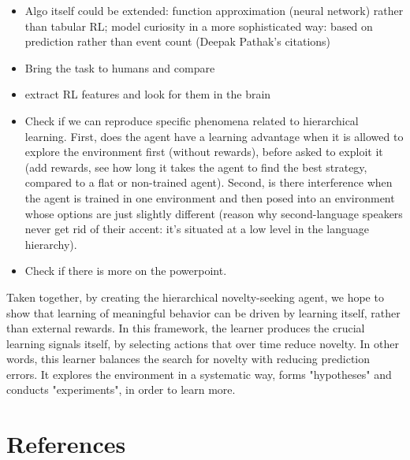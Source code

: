 \documentclass{article}
\begin{document}
\begin{itemize}
	\item Algo itself could be extended: function approximation (neural network) rather than tabular RL; model curiosity in a more sophisticated way: based on prediction rather than event count (Deepak Pathak's citations)
	\item Bring the task to humans and compare
	\item extract RL features and look for them in the brain
	\item Check if we can reproduce specific phenomena related to hierarchical learning. First, does the agent have a learning advantage when it is allowed to explore the environment first (without rewards), before asked to exploit it (add rewards, see how long it takes the agent to find the best strategy, compared to a flat or non-trained agent). Second, is there interference when the agent is trained in one environment and then posed into an environment whose options are just slightly different (reason why second-language speakers never get rid of their accent: it's situated at a low level in the language hierarchy).
	\item Check if there is more on the powerpoint.
\end{itemize}

Taken together, by creating the hierarchical novelty-seeking agent, we hope to show that learning of meaningful behavior can be driven by learning itself, rather than external rewards. In this framework, the learner produces the crucial learning signals itself, by selecting actions that over time reduce novelty. In other words, this learner balances the search for novelty with reducing prediction errors. It explores the environment in a systematic way, forms "hypotheses" and conducts "experiments", in order to learn more. 

\section*{References}

\printbibliography
\end{document}
